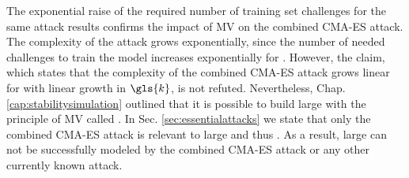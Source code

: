 The exponential raise of the required number of training set challenges for the same attack results confirms the impact of \ac{MV} on the combined \ac{CMA-ES} attack.
The complexity of the attack grows exponentially, since the number of needed challenges to train the model increases exponentially for \mxpufs.
However, the claim, which states that the complexity of the combined \ac{CMA-ES} attack grows linear for \xpufs with linear growth in $\gls{k}$, is not refuted.
Nevertheless, Chap. \ref{cap:stabilitysimulation} outlined that it is possible to build large \xpufs with the principle of \ac{MV} called \mxpufs.
In Sec. \ref{sec:essentialattacks} we state that only the combined \ac{CMA-ES} attack is relevant to large \xpufs and thus \mxpufs.
As a result, large \mxpufs can not be successfully modeled by the combined \ac{CMA-ES} attack or any other currently known attack.



